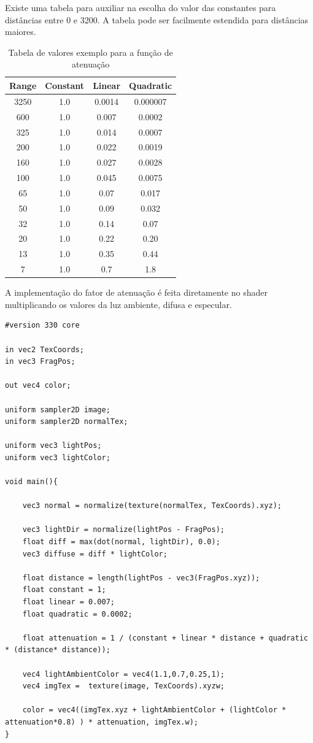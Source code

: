 \documentclass[12pt, 
openright, 
oneside, 
a4paper,    
brazil]{facom-ufu-abntex2}
\begin{document}
Existe uma tabela para auxiliar na escolha do valor das constantes para distâncias entre 0 e 3200. A tabela pode ser facilmente estendida para distâncias maiores.

\begin{table}[H]
\centering
\begin{tabular}{c c c c}
Range & Constant & Linear & Quadratic \\
\hline		
3250 & 1.0 & 0.0014 & 0.000007 \\
600 & 1.0 & 0.007 & 0.0002 \\
325 & 1.0 & 0.014 & 0.0007 \\
200 & 1.0 & 0.022 & 0.0019 \\
160 & 1.0 & 0.027 & 0.0028 \\
100 & 1.0 & 0.045 & 0.0075 \\
65 & 1.0 & 0.07 & 0.017 \\
50 & 1.0 & 0.09 & 0.032 \\
32 & 1.0 & 0.14 & 0.07 \\
20 & 1.0 & 0.22 & 0.20 \\
13 & 1.0 & 0.35 & 0.44 \\
7 & 1.0 & 0.7 & 1.8  \\

\end{tabular}
\caption{Tabela de valores exemplo para a função de atenuação}
\end{table}

A implementação do fator de atenuação é feita diretamente no shader multiplicando os valores da luz ambiente, difusa e especular.

\begin{lstlisting}[caption={Fragment Shader com luz ambiente, difusa e atenuação}]
#version 330 core

in vec2 TexCoords;
in vec3 FragPos;  

out vec4 color;

uniform sampler2D image;
uniform sampler2D normalTex;

uniform vec3 lightPos; 
uniform vec3 lightColor;

void main(){

	vec3 normal = normalize(texture(normalTex, TexCoords).xyz);

	vec3 lightDir = normalize(lightPos - FragPos);
	float diff = max(dot(normal, lightDir), 0.0);
	vec3 diffuse = diff * lightColor;
	
	float distance = length(lightPos - vec3(FragPos.xyz));
	float constant = 1;
	float linear = 0.007;
	float quadratic = 0.0002;
	
	float attenuation = 1 / (constant + linear * distance + quadratic * (distance* distance));
	
	vec4 lightAmbientColor = vec4(1.1,0.7,0.25,1);
	vec4 imgTex =  texture(image, TexCoords).xyzw;
	
	color = vec4((imgTex.xyz + lightAmbientColor + (lightColor * attenuation*0.8) ) * attenuation, imgTex.w);
}
\end{lstlisting}
\end{document}
